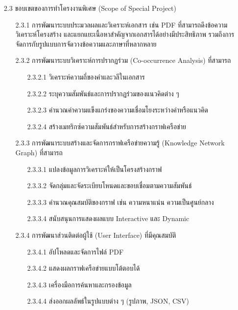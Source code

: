 \documentclass[12pt,a4paper]{article}
\newcommand{\textlight}[1]{{\thailightfont #1}}
\begin{document}
\begin{enumerate}[leftmargin=2cm]
    \item[2.3] ขอบเขตของการทำโครงงานพิเศษ (Scope of Special Project)
    \vspace{0.05cm}
    \textlight{
        \begin{enumerate}
            \item[2.3.1] การพัฒนาระบบประมวลผลและวิเคราะห์เอกสาร เช่น PDF ที่สามารถดึงข้อความ วิเคราะห์โครงสร้าง และแยกแยะเนื้อหาสำคัญจากเอกสารได้อย่างมีประสิทธิภาพ รวมถึงการจัดการกับรูปแบบการจัดวางข้อความและภาษาที่หลากหลาย
            \item[2.3.2] การพัฒนาระบบวิเคราะห์การปรากฏร่วม (Co-occurrence Analysis) ที่สามารถ
            \begin{enumerate}
                \item[2.3.2.1] วิเคราะห์ความถี่ของคำและวลีในเอกสาร
                \item[2.3.2.2] ระบุความสัมพันธ์และการปรากฏร่วมของแนวคิดต่าง ๆ
                \item[2.3.2.3] คำนวณค่าความแข็งแกร่งของความเชื่อมโยงระหว่างคำหรือแนวคิด
                \item[2.3.2.4] สร้างเมทริกซ์ความสัมพันธ์สำหรับการสร้างกราฟเครือข่าย
            \end{enumerate}
            \item[2.3.3] การพัฒนาระบบสร้างและจัดการกราฟเครือข่ายความรู้ (Knowledge Network Graph) ที่สามารถ
            \begin{enumerate}
                \item[2.3.3.1] แปลงข้อมูลการวิเคราะห์ให้เป็นโครงสร้างกราฟ
                \item[2.3.3.2] จัดกลุ่มและจัดระเบียบโหนดและขอบเชื่อมตามความสัมพันธ์
                \item[2.3.3.3] คำนวณคุณสมบัติของกราฟ เช่น ความหนาแน่น ความเป็นศูนย์กลาง
                \item[2.3.3.4] สนับสนุนการแสดงผลแบบ Interactive และ Dynamic
            \end{enumerate}
            \item[2.3.4] การพัฒนาส่วนติดต่อผู้ใช้ (User Interface) ที่มีคุณสมบัติ
            \begin{enumerate}
                \item[2.3.4.1] อัปโหลดและจัดการไฟล์ PDF
                \item[2.3.4.2] แสดงผลกราฟเครือข่ายแบบโต้ตอบได้
                \item[2.3.4.3] เครื่องมือการค้นหาและกรองข้อมูล
                \item[2.3.4.4] ส่งออกผลลัพธ์ในรูปแบบต่าง ๆ (รูปภาพ, JSON, CSV)

\end{enumerate}
\end{enumerate}}
\end{enumerate}
\end{document}
